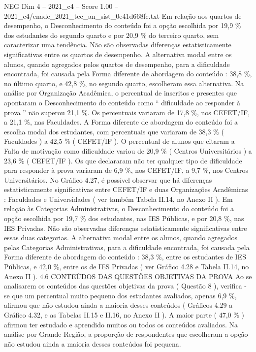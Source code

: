 \begin{textsample}{NEG Dim 4 – 2021\_c4 – Score 1.00 – 2021\_c4/enade\_2021\_tec\_an\_sist\_0e41d668fe.txt}
Em relação aos quartos de desempenho, o Desconhecimento do conteúdo foi a opção escolhida por 19,9 \% dos estudantes do segundo quarto e por 20,9 \% do terceiro quarto, sem caracterizar uma tendência.
Não são observadas diferenças estatisticamente significativas entre os quartos de desempenho.
A alternativa modal entre os alunos, quando agregados pelos quartos de desempenho, para a dificuldade encontrada, foi causada pela Forma diferente de abordagem do conteúdo : 38,8 \%, no último quarto, e 42,8 \%, no segundo quarto, escolheram essa alternativa.
Na análise por Organização Acadêmica, o percentual de inscritos e presentes que apontaram o Desconhecimento do conteúdo como “ dificuldade ao responder à prova ” não superou 21,1 \%.
Os percentuais variaram de 17,8 \%, nos CEFET/IF, a 21,1 \%, nas Faculdades.
A Forma diferente de abordagem do conteúdo foi a escolha modal dos estudantes, com percentuais que variaram de 38,3 \% ( Faculdades ) a 42,5 \% ( CEFET/IF ).
O percentual de alunos que citaram a Falta de motivação como dificuldade variou de 20,9 \% ( Centros Universitários ) a 23,6 \% ( CEFET/IF ).
Os que declararam não ter qualquer tipo de dificuldade para responder à prova variaram de 6,9 \%, nos CEFET/IF, a 9,7 \%, nos Centros Universitários.
No Gráfico 4.27, é possível observar que há diferenças estatisticamente significativas entre CEFET/IF e duas Organizações Acadêmicas : Faculdades e Universidades ( ver também Tabela II.14, no Anexo II ).
Em relação às Categorias Administrativas, o Desconhecimento do conteúdo foi a opção escolhida por 19,7 \% dos estudantes, nas IES Públicas, e por 20,8 \%, nas IES Privadas.
Não são observadas diferenças estatisticamente significativas entre essas duas categorias.
A alternativa modal entre os alunos, quando agregados pelas Categorias Administrativas, para a dificuldade encontrada, foi causada pela Forma diferente de abordagem do conteúdo : 38,3 \%, entre os estudantes de IES Públicas, e 42,0 \%, entre os de IES Privadas ( ver Gráfico 4.28 e Tabela II.14, no Anexo II ). 4.6 CONTEÚDOS DAS QUESTÕES OBJETIVAS DA PROVA Ao se analisarem os conteúdos das questões objetivas da prova ( Questão 8 ), verifica -se que um percentual muito pequeno dos estudantes avaliados, apenas 6,9 \%, afirmou que não estudou ainda a maioria desses conteúdos ( Gráficos 4.29 a Gráfico 4.32, e as Tabelas II.15 e II.16, no Anexo II ).
A maior parte ( 47,0 \% ) afirmou ter estudado e aprendido muitos ou todos os conteúdos avaliados.
Na análise por Grande Região, a proporção de respondentes que escolheram a opção não estudou ainda a maioria desses conteúdos foi pequena.

\end{textsample}
